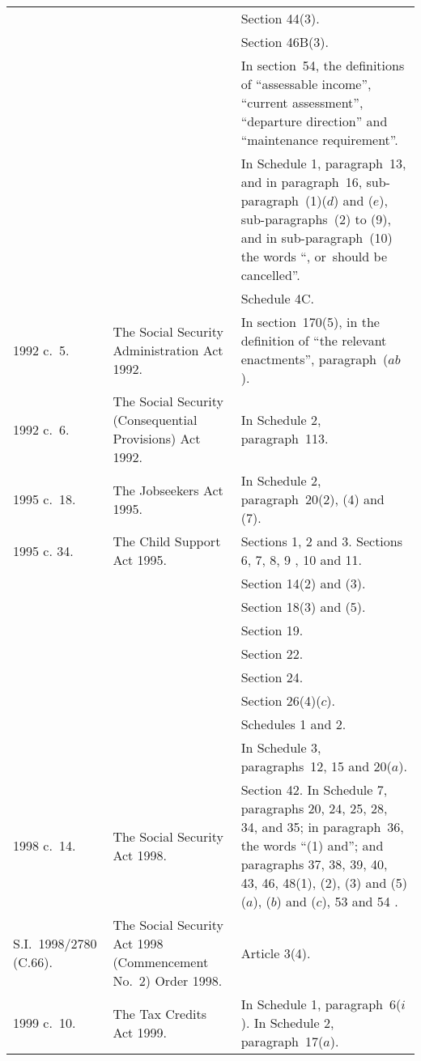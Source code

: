 \documentclass[12pt,a4paper]{article}
\begin{document}
{\begin{longtable}{p{50pt}p{83.27403pt}p{220.72266pt}}
		&&Section 44(3).\\
		&&Section 46B(3).\\
		&&In section~54, the definitions of “assessable income”, “current assessment”, “departure direction” and “maintenance requirement”.\\
		&&In Schedule 1, paragraph~13, and in paragraph~16, sub-paragraph~(1)($d$)  and ($e$), sub-paragraphs~(2)  to (9), and in sub-paragraph~(10)  the words “, or~should be cancelled”.\\
		&&Schedule 4C.\\
1992 c.\ 5. 	&The Social Security Administration Act 1992. 	&In section~170(5), in the definition of “the relevant enactments”, paragraph~($ab$).\\
1992 c.\ 6. 	&The Social Security (Consequential Provisions) Act 1992. 	&In Schedule 2, paragraph~113. \\
1995 c.\ 18. 	&The Jobseekers Act 1995. 	&In Schedule 2, paragraph~20(2), (4)  and (7).\\
1995 c. 34. 	&The Child Support Act 1995. 	&Sections 1, 2 and 3. \newline
Sections 6, 7, 8, 9%
, 10 
and 11. \\
		&&Section 14(2)  and (3).\\
		&&Section 18(3)  and (5).\\
		&&Section 19. \\
		&&Section 22. \\
		&&Section 24. \\
		&&Section 26(4)($c$).\\
		&&Schedules 1 and 2. \\
		&&In Schedule 3, paragraphs~12, 15 and 20($a$).\\
1998 c.\ 14. 	&The Social Security Act 1998. 	&Section 42. \newline
In Schedule 7, paragraphs 20, 24, 25, 
28, 34, and 35; in paragraph~36, the words “(1)  and”; and paragraphs 37, 38, 39, 40, 43, 46, 48(1), (2), (3)  and (5)($a$), ($b$)  and ($c$), 53 and 54%
.\\ 
S.I.\ 1998/\hspace{0pt}2780 (C.66).	&The Social Security Act 1998 (Commencement No.\ 2) Order 1998. 	&Article 3(4).\\
1999 c.\ 10. 	&The Tax Credits Act 1999. 	&In Schedule 1, paragraph~6($i$).\newline
In Schedule 2, paragraph~17($a$).\\
\end{longtable}

}
\end{document}
